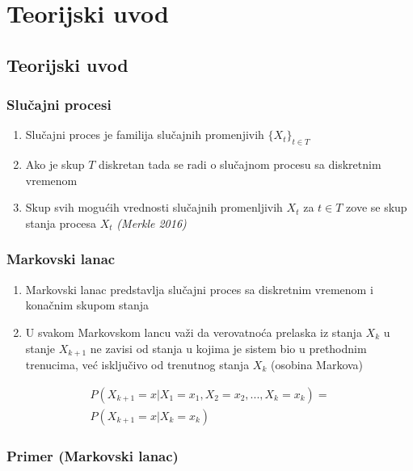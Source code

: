 \documentclass[11pt]{beamer}
\begin{document}
\section{Teorijski uvod}
\subsection{Teorijski uvod}
\begin{frame}
    \frametitle{Slučajni procesi}
  		\begin{center}
        \begin{enumerate}
                \item Slučajni proces je familija slučajnih promenjivih $\{X_t\}_{t \in T}$
               \item Ako je skup $T$ diskretan tada se radi o slučajnom procesu sa diskretnim vremenom
                \item Skup svih mogućih vrednosti slučajnih promenljivih $X_t$ za $t \in T$ zove se skup stanja procesa $X_t$ \textit{(Merkle 2016)}
            \end{enumerate}
        \end{center}
\end{frame}

\begin{frame}
    \frametitle{Markovski lanac}
  		\begin{center}
        \begin{enumerate}
                \item Markovski lanac predstavlja slučajni proces sa diskretnim vremenom i konačnim skupom stanja
                \item U svakom Markovskom lancu važi da verovatnoća prelaska iz stanja $X_k$ u stanje $X_{k+1}$ ne zavisi od stanja u kojima je sistem bio u prethodnim trenucima, već isključivo od trenutnog stanja $X_k$ (osobina Markova)
            \end{enumerate}
            \begin{equation*}
\begin{aligned}
P(X_{k+1} = x | X_{1} = x_{1}, X_{2} = x_{2}, ...,  X_{k} = x_{k}) =\\ P(X_{k+1} = x| X_{k} = x_{k})
\end{aligned}
\end{equation*}
        \end{center}
\end{frame}

\begin{frame}
    \frametitle{Primer (Markovski lanac)}
  		\begin{center}
\begin{figure}[h]
\centering{
\resizebox{90mm}{!}{}
}
\end{figure}
        \end{center}
\end{frame}
\end{document}
